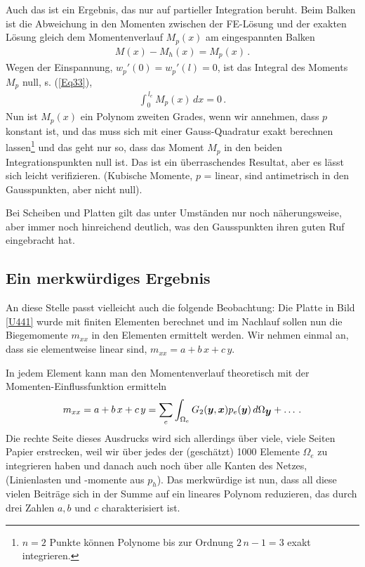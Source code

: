 Auch das ist ein Ergebnis, das nur auf partieller Integration beruht. Beim Balken ist die Abweichung in den Momenten zwischen der FE-L\"{o}sung und der exakten L\"{o}sung gleich dem Momentenverlauf $M_p(x)$ am eingespannten Balken
\begin{align}
M(x) - M_h(x) = M_p(x)\,.
\end{align}
Wegen der Einspannung, $w_p'(0) = w_p'(l) = 0$,  ist das Integral des Moments $M_p$ null, s. (\ref{Eq33}),
\begin{align}
\int_0^{\,l_e} M_p(x)\,dx = 0\,.
\end{align}
Nun ist $M_p(x)$ ein Polynom zweiten Grades, wenn wir annehmen, dass $p$ konstant ist, und das muss sich mit einer Gauss-Quadratur exakt berechnen lassen\footnote{$n = 2$ Punkte k\"{o}nnen Polynome bis zur Ordnung $2\,n - 1 = 3$ exakt integrieren.} und das geht nur so, dass das Moment $M_p$ in den beiden Integrationspunkten null ist. Das ist ein \"{u}berraschendes Resultat, aber es l\"{a}sst sich leicht verifizieren. (Kubische Momente, $p$ = linear, sind antimetrisch in den Gausspunkten, aber nicht null).

Bei Scheiben und Platten gilt das unter Umst\"{a}nden nur noch n\"{a}herungsweise, aber immer noch hinreichend deutlich, was den Gausspunkten ihren guten Ruf eingebracht hat.

\textcolor{sectionTitleBlue}{\section{Ein merkw\"{u}rdiges Ergebnis}}\label{Dimensionsbetrachtung}
An diese Stelle passt vielleicht auch die folgende Beobachtung: Die Platte in Bild \ref{U441} wurde mit finiten Elementen berechnet und im Nachlauf sollen nun die Biegemomente $m_{xx}$ in den Elementen ermittelt werden. Wir nehmen einmal an, dass sie elementweise linear sind, $m_{xx} = a + b\,x + c\,y$.

In jedem Element kann man den Momentenverlauf theoretisch mit der  Momenten-Einflussfunktion ermitteln
\begin{align}
m_{xx} = a + b\,x + c\,y = \sum_e \int_{\Omega_e} G_2(\mbox{\boldmath $y$},\mbox{\boldmath $x$}) p_e(\mbox{\boldmath $y$})\,d\Omega_{\mbox{\boldmath $y$}} + \ldots\,.
\end{align}
Die rechte Seite dieses Ausdrucks wird sich allerdings \"{u}ber viele, viele Seiten Papier erstrecken, weil wir \"{u}ber jedes der (gesch\"{a}tzt) 1000 Elemente $\Omega_e$ zu integrieren haben und danach auch noch \"{u}ber alle Kanten des Netzes, (Linienlasten und -momente aus $p_h$). Das merkw\"{u}rdige ist nun, dass all diese vielen Beitr\"{a}ge sich in der Summe auf ein lineares Polynom reduzieren, das durch drei Zahlen $a, b$  und $c$ charakterisiert ist.


